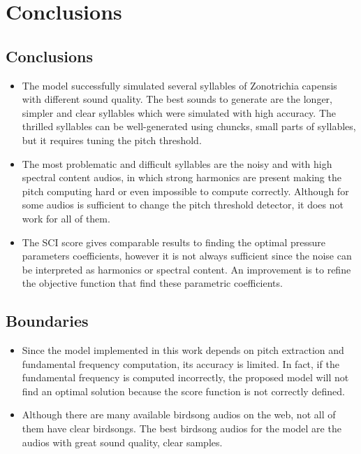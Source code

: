 \chapter{Conclusions}\label{chap_conclusions}

\section{Conclusions}


\begin{itemize}
    \item The model successfully simulated several syllables of  Zonotrichia capensis with different sound quality. The best sounds to generate are the longer, simpler and clear syllables which were simulated with high accuracy. The thrilled syllables can be well-generated using chuncks, small parts of syllables, but it requires tuning the pitch threshold.
    
    \item The most problematic and difficult syllables are the noisy and with high spectral content audios, in which strong harmonics are present making the pitch computing hard or even impossible to compute correctly. Although for some audios is sufficient to change the pitch threshold detector, it does not work for all of them.
    
    \item The SCI score gives comparable results to finding the optimal pressure parameters coefficients, however it is not always sufficient since the noise can be interpreted as harmonics or spectral content. An improvement is to refine the objective function that find these parametric coefficients.
    
\end{itemize}

\section{Boundaries}

\begin{itemize}
    \item Since the model implemented in this work depends on pitch extraction and fundamental frequency computation, its accuracy is limited. In fact, if the fundamental frequency is computed incorrectly, the proposed model will not find an optimal solution because the score function is not correctly defined. 
    
    \item Although there are many available birdsong audios on the web, not all of them have clear birdsongs. The best birdsong audios for the model are the audios with great sound quality, clear samples. 
\end{itemize}


